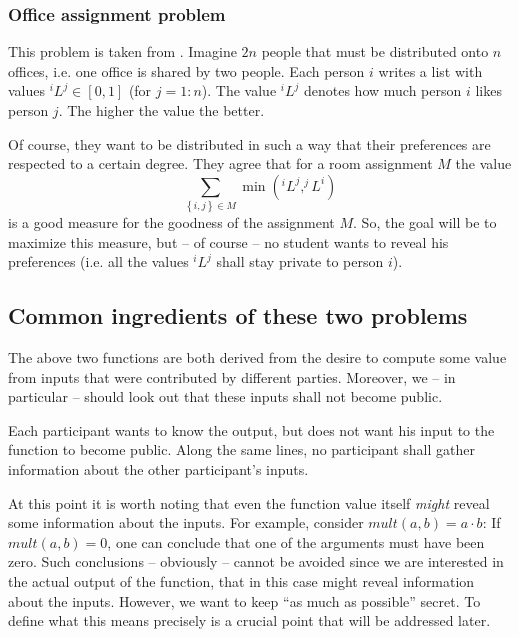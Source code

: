 \subsubsection{Office assignment problem}
\label{sec:office-assignment-intro-problem}

This problem is taken from \cite{Rogaway:1991:RCS:888502}. Imagine $2n$ people that must be distributed onto $n$ offices, i.e. one office is shared by two people. Each person $i$ writes a list with values $^iL^j\in [0,1]$ (for $j=1:n$). The value $^iL^j$ denotes how much person $i$ likes person $j$. The higher the value the better.

Of course, they want to be distributed in such a way that their preferences are respected to a certain degree. They agree that for a room assignment $M$ the value
\begin{equation*}
\sum_{\left\{i,j \right\}\in M}\min(^iL^j, ^jL^i)
\end{equation*}
is a good measure for the goodness of the assignment $M$. So, the goal will be to maximize this measure, but -- of course -- no student wants to reveal his preferences (i.e. all the values $^iL^j$ shall stay private to person $i$).

\subsection{Common ingredients of these two problems}
\label{sec:introductory-common-ingredients}

The above two functions are both derived from the desire to compute some value from inputs that were contributed by different parties. Moreover, we -- in particular -- should look out that these inputs shall not become public.

Each participant wants to know the output, but does not want his input to the function to become public. Along the same lines, no participant shall gather information about the other participant's inputs.

At this point it is worth noting that even the function value itself \emph{might} reveal some information about the inputs. For example, consider $mult(a,b)=a\cdot b$: If $mult(a,b)=0$, one can conclude that one of the arguments must have been zero. Such conclusions -- obviously -- cannot be avoided since we are interested in the actual output of the function, that in this case might reveal information about the inputs. However, we want to keep ``as much as possible'' secret. To define what this means precisely is a crucial point that will be addressed later.

